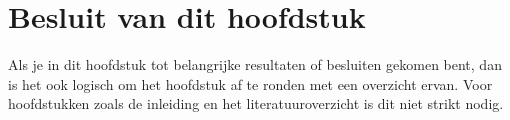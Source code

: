 \section{Besluit van dit hoofdstuk}
Als je in dit hoofdstuk tot belangrijke resultaten of besluiten gekomen
bent, dan is het ook logisch om het hoofdstuk af te ronden met een
overzicht ervan. Voor hoofdstukken zoals de inleiding en het
literatuuroverzicht is dit niet strikt nodig.

